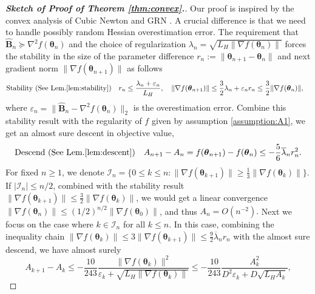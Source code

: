 \documentclass[11pt]{amsart}
\theoremstyle{plain}
\theoremstyle{definition}
\theoremstyle{remark}
\def\eps{\varepsilon}
\def\B{\mathbf{B}}
\def\param{\boldsymbol{\theta}}
\newcommand{\innp}[1]{\left\langle #1 \right\rangle}
\begin{document}
\begin{proof}[\textbf{\textit{Sketch of Proof of Theorem \ref{thm:convex}.}}]
Our proof is inspired by the convex analysis of Cubic Newton \cite{nesterov2006cubic} and GRN \cite{mishchenko2023regularized}. A crucial difference is that we need to handle possibly random Hessian overestimation error. The requirement that $\hat{\B}_n\succcurlyeq\nabla^2f(\param_n)$ and the choice of regularization $\lambda_n=\sqrt{L_H\|\nabla f(\param_n)\|}$ forces the stability in the size of the parameter difference $r_n:=\|\param_{n+1}-\param_n\|$ and next gradient norm $\|\nabla f(\param_{n+1})\|$ as follows
\begin{align*}
    \text{Stability (See Lem.\ref{lem:stability})}&\quad r_n\leq \frac{{\lambda}_n+\eps_n}{L_H},\quad \|\nabla f(\param_{n+1})\|\leq \frac{3}{2}{\lambda_n+\eps_n}r_n\leq \frac{3}{2}\|\nabla f(\param_n)\|,
\end{align*}
where $\eps_n=\|\hat{\B}_n-\nabla^2f(\param_n)\|_2$ is the overestimation error.
Combine this stability result with the regularity of $f$ given by assumption \ref{assumption:A1}, we get an almost sure descent in objective value,
\[
\text{Descend (See Lem.\ref{lem:descent})}\quad A_{n+1}-A_{n}=f(\param_{n+1})-f(\param_{n})\leq -\frac{5}{6}\overline{\lambda}_nr_n^2.
\]
For fixed $n\geq 1$, we denote $\mathcal{I}_n=\{0\leq k\leq n:\|\nabla f(\param_{k+1})\|\geq \frac{1}{3}\|\nabla f(\param_k)\|\}$. If $|\mathcal{I}_n|\leq n/2$, combined with the stability result $\|\nabla f(\param_{k+1})\|\leq \frac{3}{2}\|\nabla f(\param_k)\|$, we would get a linear convergence $\|\nabla f(\param_{n})\|\leq (1/2)^{n/2}\|\nabla f(\param_0)\|$, and thus $A_{n}=O(n^{-2}).$ Next we focus on the case where $k\in\mathcal{I}_n$ for all $k\leq n$. In this case, combining the inequality chain $\|\nabla f(\param_k)\|\leq 3\|\nabla f(\param_{k+1})\|\leq \frac{9}{2}\overline{\lambda}_nr_n$ with the almost sure descend, we have almost surely
\[
A_{k+1}-A_k\leq -\frac{10}{243}\frac{\|\nabla f(\param_k)\|^2}{\eps_k+\sqrt{L_H\|\nabla f(\param_k)\|}}\leq -\frac{10}{243}\frac{A_k^2}{D^2\eps_k+D\sqrt{L_HA_k}},
\]

\end{proof}
\end{document}
